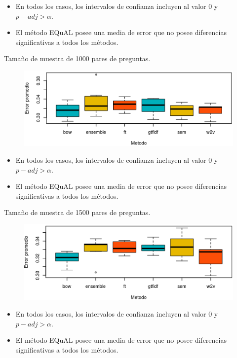 \begin{frame}
	\begin{itemize}[<*>]
		\item En todos los casos, los intervalos de confianza incluyen al valor 0 y \(p{-}adj > \alpha\).
		\item El método EQuAL posee una media de error que no posee diferencias significativas a todos los métodos.
	\end{itemize}

	\framebreak

	Tamaño de muestra de 1000 pares de preguntas.
	\begin{figure}[!htbp]
		\centering
		\includegraphics[width=0.7\linewidth]{../10_resultados/imagenes/anova_1000}
		\label{fig:anova1000-1}
	\end{figure}

	\begin{itemize}[<*>]
		\item En todos los casos, los intervalos de confianza incluyen al valor 0 y \(p{-}adj > \alpha\).
		\item El método EQuAL posee una media de error que no posee diferencias significativas a todos los métodos.
	\end{itemize}

	\framebreak

	Tamaño de muestra de 1500 pares de preguntas.
	\begin{figure}[!htbp]
		\centering
		\includegraphics[width=0.7\linewidth]{../10_resultados/imagenes/anova_1500}
		\label{fig:anova1500-1}
	\end{figure}

	\begin{itemize}[<*>]
		\item En todos los casos, los intervalos de confianza incluyen al valor 0 y \(p{-}adj > \alpha\).
		\item El método EQuAL posee una media de error que no posee diferencias significativas a todos los métodos.
	\end{itemize}


\end{frame}

